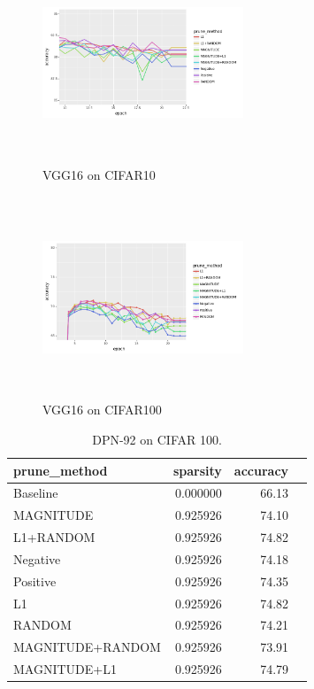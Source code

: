 \documentclass[runningheads]{llncs}
\begin{document}
\begin{figure}[H]
\centering
\includegraphics[width=6cm, height=6cm]{Paper/images/vgg16cifar10.png}
\caption{VGG16 on CIFAR10}
\end{figure}
\begin{figure}[H]
\centering
\includegraphics[width=6cm, height=6cm]{Paper/images/vgg16cifar100.png}
\caption{VGG16 on CIFAR100}
\end{figure}
\begin{table}[h]
\begin{tabular}{|l|r|r|r|}
\hline
     prune\_method &  sparsity &  accuracy \\ \hline
     Baseline  &  0.000000 &     66.13 \\ \hline
        MAGNITUDE &  0.925926 &     74.10 \\ \hline
        L1+RANDOM &  0.925926 &     74.82 \\ \hline
         Negative &  0.925926 &     74.18 \\ \hline
         Positive &  0.925926 &     74.35 \\ \hline
               L1 &  0.925926 &     74.82 \\ \hline
           RANDOM &  0.925926 &     74.21 \\ \hline
 MAGNITUDE+RANDOM &  0.925926 &     73.91 \\ \hline
     MAGNITUDE+L1 &  0.925926 &     74.79 \\ \hline
\end{tabular}
\label{tab:cifar100-DPN92}
\caption{DPN-92 on CIFAR 100. }
\end{table}
\end{document}
